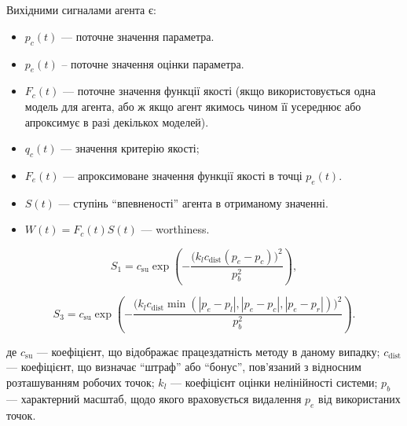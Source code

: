 \documentclass[14pt,handout,utf8]{beamer}
\newcommand{\Xhead}[1]{
 \begin{center}%
      \textbf{#1}%
 \end{center}%
}
\begin{document}
\begin{frame}
  \frametitle{~}

  \Xhead{}

  Вихідними сигналами агента є:

  \begin{itemize}

    \item
      $p_c(t)$ ---
      поточне значення параметра.

    \item
      $p_e(t)$\label{atu:d:p_e} --
      поточне значення оцінки параметра.

    \item
      $F_c(t)$ ---
      поточне значення функції якості (якщо використовується одна
      модель для агента, або ж якщо агент якимось чином її усереднює
      або апроксимує в разі декількох моделей).

    \item
      $q_c(t)$ ---
      значення критерію якості;

    \item
      $F_e(t)$ ---
      апроксимоване значення функції якості в точці
      $p_e(t)$.

    \item
      $S(t)$ ---
      ступінь ``впевненості'' агента в отриманому значенні.

    \item
   $W(t) = F_c(t) S(t)$ --- worthiness.
  \end{itemize}

\vfill

\begin{equation}
  S_1 = c_\mathrm{su} \exp \left( - \frac{ \big( k_l c_\mathrm{dist} ( p_e - p_c ) \big)^2 }{p_b^2} \right)
  ,
  \label{atu:eq:S1}
\end{equation}

\vfill

\begin{equation}
  S_3 = c_\mathrm{su} \exp \left( - \frac{ \big( k_l c_\mathrm{dist} \min( |p_e - p_l|,|p_e - p_c|, |p_e - p_r| ) \big)^2 }{p_b^2} \right)
  .
  \label{atu:eq:S3}
\end{equation}
\vfill

%
\noindent
де
$c_\mathrm{su}$ ---
коефіцієнт, що відображає працездатність методу в даному випадку;
$c_\mathrm{dist}$ ---
коефіцієнт, що визначає ``штраф'' або ``бонус'', пов'язаний з відносним розташуванням робочих точок;
$k_l$ ---
коефіцієнт оцінки нелінійності системи;
$p_b$
--- характерний масштаб, щодо якого враховується видалення $p_e$ від використаних точок.

\end{frame}
\end{document}
